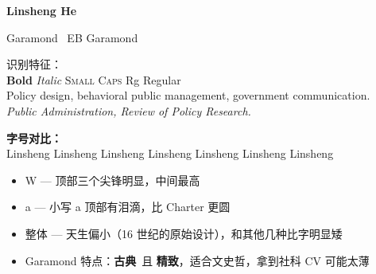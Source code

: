\documentclass[11pt, a4paper]{article}
\begin{document}
{\fontsize{24pt}{30pt}\selectfont\bfseries Linsheng He}

\vspace{6pt}
{\LARGE Garamond \textbullet\ EB Garamond}

\vspace{12pt}
{\footnotesize 识别特征：}\\[2pt]
{\large \textbf{Bold} \textit{Italic} \textsc{Small Caps} Rg Regular}\\[4pt]
{\large Policy design, behavioral public management, government communication.}\\[4pt]
{\large\itshape Public Administration, Review of Policy Research.}

\vspace{16pt}
{\footnotesize\bfseries 字号对比：}\\[2pt]
{\tiny Linsheng} {\scriptsize Linsheng} {\footnotesize Linsheng} {\small Linsheng}
Linsheng {\large Linsheng} {\Large Linsheng}

\vspace{12pt}
\begin{itemize}
    \item W --- 顶部三个尖锋明显，中间最高
    \item a --- 小写 a 顶部有泪滴，比 Charter 更圆
    \item 整体 --- 天生偏小（16 世纪的原始设计），和其他几种比字明显矮
    \item Garamond 特点：\textbf{古典}\ 且 \textbf{精致}，适合文史哲，拿到社科 CV 可能太薄
\end{itemize}
\end{document}
